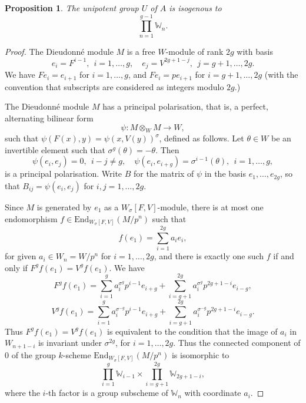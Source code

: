 \documentclass[a4paper,12pt,twoside]{report}
\newtheorem{proposition}[theorem]{Proposition}
\newcommand{\W}{\mathbb{W}}
\begin{document}
\begin{proposition}
    The unipotent group $U$ of $A$ is isogenous to 
    \[ \prod_{n=1}^{g-1}\W_n.\]
\end{proposition}
\begin{proof} The Dieudonné module $M$ is a free $W$-module of rank $2g$ with basis 
$$e_i=F^{i-1}, \ \  i=1,\ldots, g, \quad e_j=V^{2g+1-j},\ \  j=g+1,\ldots,2g.$$
We have $Fe_i=e_{i+1}$ for $i=1,\ldots, g$, and $Fe_i=pe_{i+1}$ for $i=g+1,\ldots, 2g$
(with the convention that subscripts are considered as integers modulo $2g$.) 

The Dieudonn\'e module $M$ has a principal polarisation,
that is, a perfect, alternating bilinear form
$$\psi\colon M\otimes_W M\to W,$$ 
such that $\psi(F(x),y)=\psi(x,V(y))^\sigma$,
defined as follows. Let $\theta\in W$
be an invertible element such that $\sigma^g(\theta)=-\theta$. Then
$$\psi(e_i,e_j)=0, \ \ i-j\neq g, \quad \psi(e_i,e_{i+g})=\sigma^{i-1}(\theta), \ \ i=1,\ldots, g,$$
is a principal polarisation. Write $B$ for the matrix of 
$\psi$ in the basis $e_1,\ldots,e_{2g}$, so that $B_{ij}=\psi(e_i,e_j)$ for $i,j=1,\ldots,2g$.

Since $M$ is generated by $e_1$ as a $W_{\sigma}[F,V]$-module, there is at most one endomorphism
$f\in\mathrm{End}_{W_{\sigma}[F,V]}(M/p^n)$ such that 
$$f(e_1)=\sum_{i=1}^{2g} a_i e_i,$$
for given $a_i\in W_n=W/p^n$ for $i=1,\ldots,2g$, and there is exactly one such $f$
if and only if $F^g f(e_1)=V^g f(e_1)$. We have
$$F^g f(e_1)=\sum_{i=1}^g a_i^{\sigma^g}p^{i-1}e_{i+g} +
\sum_{i=g+1}^{2g}a_i^{\sigma^g}p^{2g+1-i}e_{i-g},$$
$$V^g f(e_1)=\sum_{i=1}^g a_i^{\sigma^{-g}}p^{i-1}e_{i+g} +
\sum_{i=g+1}^{2g}a_i^{\sigma^{-g}}p^{2g+1-i}e_{i-g}.$$
Thus $F^g f(e_1)=V^g f(e_1)$ is equivalent to 
the condition that the image of $a_i$ in $W_{n+1-i}$ is invariant under $\sigma^{2g}$,
for $i=1,\ldots,2g$. Thus the connected component of $0$ of the group $k$-scheme
$\mathrm{End}_{W_{\sigma}[F,V]}(M/p^n)$ is isomorphic to 
\begin{equation}
\prod_{i=1}^g {\mathbb W}_{i-1}\times \prod_{i=g+1}^{2g}{\mathbb W}_{2g+1-i},
\label{W}\end{equation}
where the $i$-th factor is a group subscheme of $\W_n$ with coordinate $a_i$.


\end{proof}
\end{document}
